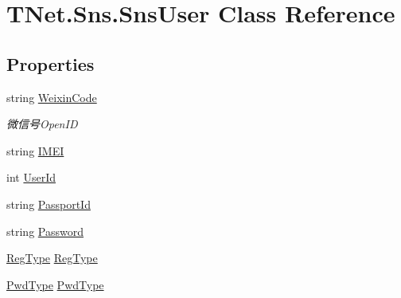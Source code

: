 \hypertarget{class_t_net_1_1_sns_1_1_sns_user}{}\section{T\+Net.\+Sns.\+Sns\+User Class Reference}
\label{class_t_net_1_1_sns_1_1_sns_user}


 


\subsection*{Properties}
\begin{DoxyCompactItemize}
\item 
string \mbox{\hyperlink{class_t_net_1_1_sns_1_1_sns_user_adff9405b9ed63f40662c1532ea738005}{Weixin\+Code}}
\begin{DoxyCompactList}\small\item\em 微信号\+Open\+ID \end{DoxyCompactList}\item 
string \mbox{\hyperlink{class_t_net_1_1_sns_1_1_sns_user_a8adf9d8183dd8ad1033f329b075f2d2d}{I\+M\+EI}}
\item 
int \mbox{\hyperlink{class_t_net_1_1_sns_1_1_sns_user_a890a025d66bf66b82a18fb5178974afd}{User\+Id}}
\item 
string \mbox{\hyperlink{class_t_net_1_1_sns_1_1_sns_user_afc8a4fed04cd873349cbd6e13e31c3ec}{Passport\+Id}}
\item 
string \mbox{\hyperlink{class_t_net_1_1_sns_1_1_sns_user_ababdc96bfcd5249ef5afdcc39ec2996b}{Password}}
\item 
\mbox{\hyperlink{namespace_t_net_1_1_sns_a338402ea3c5dbc36f95f0a7e4c1cd3a2}{Reg\+Type}} \mbox{\hyperlink{class_t_net_1_1_sns_1_1_sns_user_ad30cbf54dceffebde9a7bf67736528e5}{Reg\+Type}}
\item 
\mbox{\hyperlink{namespace_t_net_1_1_sns_a9176c2d4c1f71e42244386252d163f70}{Pwd\+Type}} \mbox{\hyperlink{class_t_net_1_1_sns_1_1_sns_user_a83c05d32970de88b3d50ec72a4b46a4e}{Pwd\+Type}}

\end{DoxyCompactItemize}
